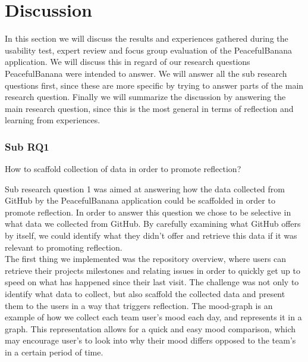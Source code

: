 \section{Discussion}
In this section we will discuss the results and experiences gathered during the usability test, expert review and focus group evaluation of the PeacefulBanana application. We will discuss this in regard of our research questions PeacefulBanana were intended to answer. We will answer all the sub research questions first, since these are more specific by trying to answer parts of the main research question. Finally we will summarize the discussion by answering the main research question, since this is the most general in terms of reflection and learning from experiences. 

\noindent\makebox[\linewidth]{\rule{\textwidth}{0.5pt}} 

\subsubsection{Sub RQ1}
\noindent\makebox[\linewidth]{\rule{\textwidth}{0.5pt}} 

\begin{center}
How to scaffold collection of data in order to promote reflection? 
\end{center}

\noindent\makebox[\linewidth]{\rule{\textwidth}{0.5pt}} 
Sub research question 1 was aimed at answering how the data collected from GitHub by the PeacefulBanana application could be scaffolded in order to promote reflection. 
In order to answer this question we chose to be selective in what data we collected from GitHub. By carefully examining what GitHub offers by itself, we could identify what they didn't offer and retrieve this data if it was relevant to promoting reflection. \\
The first thing we implemented was the repository overview, where users can retrieve their projects milestones and relating issues in order to quickly get up to speed on what has happened since their last visit. The challenge was not only to identify what data to collect, but also scaffold the collected data and present them to the users in a way that triggers reflection. The mood-graph is an example of how we collect each team user's mood each day, and represents it in a graph. This representation allows for a quick and easy mood comparison, which may encourage user's to look into why their mood differs opposed to the team's in a certain period of time. 

